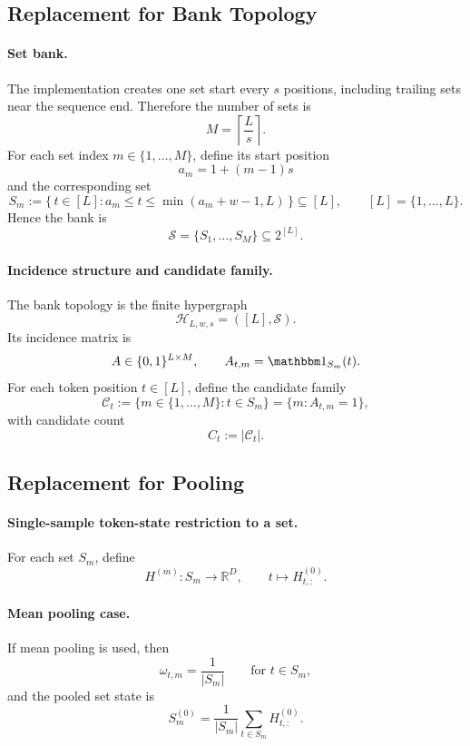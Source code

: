 \subsection*{Replacement for Bank Topology}

\paragraph{Set bank.}
The implementation creates one set start every \(s\) positions, including
trailing sets near the sequence end. Therefore the number of sets is
\[
M=\left\lceil \frac{L}{s}\right\rceil.
\]
For each set index \(m\in\{1,\dots,M\}\), define its start position
\[
a_m = 1 + (m-1)s
\]
and the corresponding set
\[
S_m
:=
\{\, t\in[L] : a_m \le t \le \min(a_m+w-1,L)\,\}
\subseteq [L],
\qquad
[L]=\{1,\dots,L\}.
\]
Hence the bank is
\[
\mathcal S=\{S_1,\dots,S_M\}\subseteq 2^{[L]}.
\]

\paragraph{Incidence structure and candidate family.}
The bank topology is the finite hypergraph
\[
\mathcal H_{L,w,s}=([L],\mathcal S).
\]
Its incidence matrix is
\[
A\in\{0,1\}^{L\times M},
\qquad
A_{t,m}=\mathbbm 1_{S_m}(t).
\]
For each token position \(t\in[L]\), define the candidate family
\[
\mathcal C_t
:=
\{m\in\{1,\dots,M\}:t\in S_m\}
=
\{m:A_{t,m}=1\},
\]
with candidate count
\[
C_t := |\mathcal C_t|.
\]

\subsection*{Replacement for Pooling}

\paragraph{Single-sample token-state restriction to a set.}
For each set \(S_m\), define
\[
H^{(m)}:S_m\to\mathbb R^D,
\qquad
t\mapsto H^{(0)}_{t,:}.
\]

\paragraph{Mean pooling case.}
If mean pooling is used, then
\[
\omega_{t,m}=\frac{1}{|S_m|}
\qquad \text{for } t\in S_m,
\]
and the pooled set state is
\[
S_m^{(0)}
=
\frac{1}{|S_m|}\sum_{t\in S_m} H^{(0)}_{t,:}.
\]

